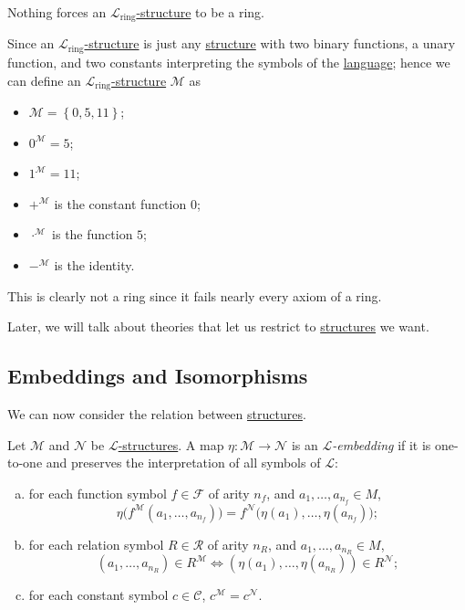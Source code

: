 \begin{eg}
	Nothing forces an \hyperref[def:structure]{\(\mathcal{L} _{\text{ring} }\)-structure} to be a ring.
\end{eg}
\begin{explanation}
	Since an \hyperref[def:structure]{\(\mathcal{L} _{\text{ring} }\)-structure} is just any \hyperref[def:structure]{structure} with two binary functions, a unary function, and two constants interpreting the symbols of the \hyperref[def:language]{language}; hence we can define an \hyperref[def:structure]{\(\mathcal{L} _{\text{ring} }\)-structure} \(\mathcal{M} \) as
	\begin{itemize}
		\item \(\mathcal{M} = \left\{ 0, 5, 11 \right\} \);
		\item \(0^{\mathcal{M} } = 5\);
		\item \(1^{\mathcal{M} } = 11\);
		\item \(+^{\mathcal{M} } \) is the constant function \(0\);
		\item \(\cdot^{\mathcal{M} }\) is the function \(5\);
		\item \(-^{\mathcal{M} }\) is the identity.
	\end{itemize}
	This is clearly not a ring since it fails nearly every axiom of a ring.
\end{explanation}

\begin{note}
	Later, we will talk about theories that let us restrict to \hyperref[def:structure]{structures} we want.
\end{note}

\subsection{Embeddings and Isomorphisms}
We can now consider the relation between \hyperref[def:structure]{structures}.

\begin{definition}[Embedding]\label{def:embedding}
	Let \(\mathcal{M} \) and \(\mathcal{N} \) be \hyperref[def:structure]{\(\mathcal{L} \)-structures}. A map \(\eta \colon \mathcal{M}  \to \mathcal{N} \) is an \emph{\(\mathcal{L} \)-embedding} if it is one-to-one and preserves the interpretation of all symbols of \(\mathcal{L} \):
	\begin{enumerate}[(a)]
		\item for each function symbol \(f\in \mathcal{F} \) of arity \(n_f\), and \(a_1, \ldots , a_{n_f}\in M \),
		      \[
			      \eta \big(f^{\mathcal{M} }(a_1, \ldots , a_{n_f})\big) = f^{\mathcal{N}} \big( \eta (a_1), \ldots , \eta (a_{n_f})\big);
		      \]
		      \item\label{def:embedding-relation} for each relation symbol \(R\in \mathcal{R} \) of arity \(n_R\), and \(a_1, \ldots , a_{n_R}\in M\),
		      \[
			      (a_1, \ldots , a_{n_R})\in R^{\mathcal{M} } \iff (\eta (a_1), \ldots , \eta (a_{n_R})) \in R^{\mathcal{N} };
		      \]
		\item for each constant symbol \(c\in \mathcal{C} \), \(c^{\mathcal{M} } = c^{\mathcal{N} }\).
	\end{enumerate}
\end{definition}


